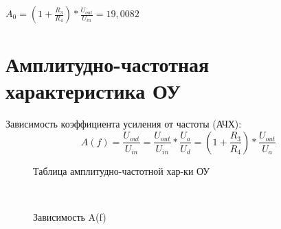 \documentclass[15pt,a5paper,reqno]{article}
\begin{document}
    \vspace{0,3cm}

    $A_0 = (1 + \frac{R_3}{R_4}) * \frac{U_{out}}{U_{in}} = 19,0082$

\section{Амплитудно-частотная характеристика ОУ}
    Зависимость коэффициента усиления от частоты (АЧХ):
    $$ A(f) = \frac{U_{out}}{U_{in}} = \frac{U_{out}}{U_{in}} * \frac{U_a}{U_d} = (1 + \frac{R_3}{R_4}) * \frac{U_{out}}{U_a}$$
    \begin {figure}[h!]
      \caption{Таблица амплитудно-частотной хар-ки ОУ}      
      \label {fig:image1}
    \end {figure}

    \begin {figure}[h!]
    \\
      \caption{Зависимость A(f)}
    \label {fig:image2}
    \end {figure}
\end{document}
